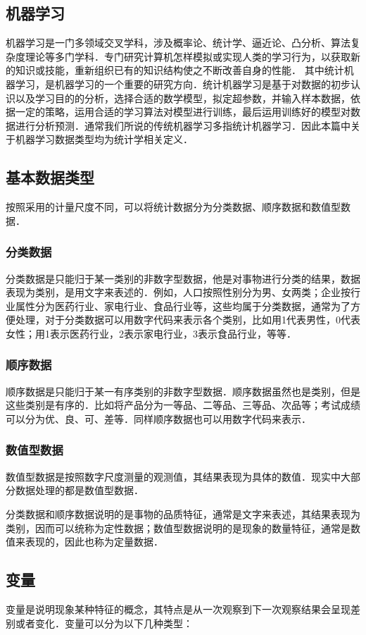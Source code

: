 \subsection{机器学习}
机器学习是一门多领域交叉学科，涉及概率论、统计学、逼近论、凸分析、算法复杂度理论等多门学科．专门研究计算机怎样模拟或实现人类的学习行为，以获取新的知识或技能，重新组织已有的知识结构使之不断改善自身的性能．
其中统计机器学习，是机器学习的一个重要的研究方向．统计机器学习是基于对数据的初步认识以及学习目的的分析，选择合适的数学模型，拟定超参数，并输入样本数据，依据一定的策略，运用合适的学习算法对模型进行训练，最后运用训练好的模型对数据进行分析预测．通常我们所说的传统机器学习多指统计机器学习．因此本篇中关于机器学习数据类型均为统计学相关定义．

\subsection{基本数据类型}
按照采用的计量尺度不同，可以将统计数据分为分类数据、顺序数据和数值型数据．
\subsubsection{分类数据}
分类数据是只能归于某一类别的非数字型数据，他是对事物进行分类的结果，数据表现为类别，是用文字来表述的．例如，人口按照性别分为男、女两类；企业按行业属性分为医药行业、家电行业、食品行业等，这些均属于分类数据，通常为了方便处理，对于分类数据可以用数字代码来表示各个类别，比如用1代表男性，0代表女性；用1表示医药行业，2表示家电行业，3表示食品行业，等等．
\subsubsection{顺序数据}
顺序数据是只能归于某一有序类别的非数字型数据．顺序数据虽然也是类别，但是这些类别是有序的．比如将产品分为一等品、二等品、三等品、次品等；考试成绩可以分为优、良、可、差等．同样顺序数据也可以用数字代码来表示．
\subsubsection{数值型数据}
数值型数据是按照数字尺度测量的观测值，其结果表现为具体的数值．现实中大部分数据处理的都是数值型数据．

分类数据和顺序数据说明的是事物的品质特征，通常是文字来表述，其结果表现为类别，因而可以统称为定性数据；数值型数据说明的是现象的数量特征，通常是数值来表现的，因此也称为定量数据．
\subsection{变量}
变量是说明现象某种特征的概念，其特点是从一次观察到下一次观察结果会呈现差别或者变化．变量可以分为以下几种类型：
